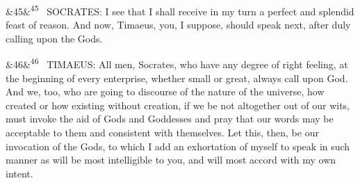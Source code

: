 \documentclass[12pt]{article}
\newcommand{\para}[1][]{\par\noindent\ifx&#1&\else\textsuperscript{\footnotesize #1}~\fi}
\begin{document}
\para[45] SOCRATES: I see that I shall receive in my turn a perfect and splendid feast of reason. And now, Timaeus, you, I suppose, should speak next, after duly calling upon the Gods.

\para[46] TIMAEUS: All men, Socrates, who have any degree of right feeling, at the beginning of every enterprise, whether small or great, always call upon God. And we, too, who are going to discourse of the nature of the universe, how created or how existing without creation, if we be not altogether out of our wits, must invoke the aid of Gods and Goddesses and pray that our words may be acceptable to them and consistent with themselves. Let this, then, be our invocation of the Gods, to which I add an exhortation of myself to speak in such manner as will be most intelligible to you, and will most accord with my own intent.
\end{document}
